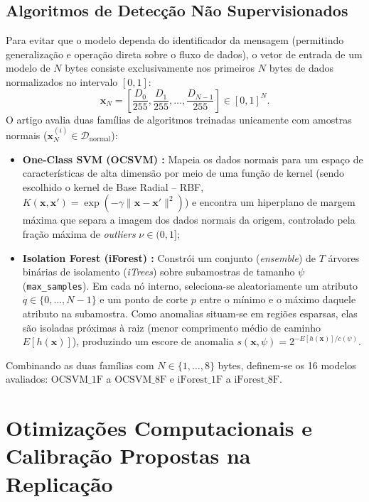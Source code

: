 \documentclass[conference]{IEEEtran}
\begin{document}
\subsection{Algoritmos de Detecção Não Supervisionados}
Para evitar que o modelo dependa do identificador da mensagem (permitindo generalização e operação direta sobre o fluxo de dados), o vetor de entrada de um modelo de $N$ bytes consiste exclusivamente nos primeiros $N$ bytes de dados normalizados no intervalo $[0, 1]$:
\begin{equation}
\mathbf{x}_N = \left[ \frac{D_0}{255}, \frac{D_1}{255}, \dots, \frac{D_{N-1}}{255} \right] \in [0, 1]^N.
\label{eq:normalization}
\end{equation}
O artigo avalia duas famílias de algoritmos treinadas unicamente com amostras normais ($\mathbf{x}_N^{(i)} \in \mathcal{D}_{\text{normal}}$):
\begin{itemize}
    \item \textbf{One-Class SVM (OCSVM) \cite{scholkopf2001estimating}:} Mapeia os dados normais para um espaço de características de alta dimensão por meio de uma função de kernel (sendo escolhido o kernel de Base Radial -- RBF, $K(\mathbf{x}, \mathbf{x}') = \exp(-\gamma \|\mathbf{x} - \mathbf{x}'\|^2)$) e encontra um hiperplano de margem máxima que separa a imagem dos dados normais da origem, controlado pela fração máxima de \textit{outliers} $\nu \in (0, 1]$;
    \item \textbf{Isolation Forest (iForest) \cite{liu2008isolation}:} Constrói um conjunto (\textit{ensemble}) de $T$ árvores binárias de isolamento (\textit{iTrees}) sobre subamostras de tamanho $\psi$ (\texttt{max\_samples}). Em cada nó interno, seleciona-se aleatoriamente um atributo $q \in \{0, \dots, N-1\}$ e um ponto de corte $p$ entre o mínimo e o máximo daquele atributo na subamostra. Como anomalias situam-se em regiões esparsas, elas são isoladas próximas à raiz (menor comprimento médio de caminho $E[h(\mathbf{x})]$), produzindo um escore de anomalia $s(\mathbf{x}, \psi) = 2^{-E[h(\mathbf{x})]/c(\psi)}$.
\end{itemize}
Combinando as duas famílias com $N \in \{1, \dots, 8\}$ bytes, definem-se os 16 modelos avaliados: $\text{OCSVM\_1F}$ a $\text{OCSVM\_8F}$ e $\text{iForest\_1F}$ a $\text{iForest\_8F}$.

\section{Otimizações Computacionais e Calibração Propostas na Replicação}
\end{document}
